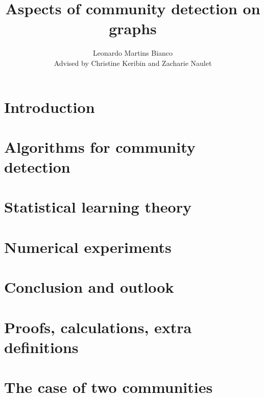 \documentclass[11pt]{report}
\title{Aspects of community detection on graphs}
\author{Leonardo Martins Bianco\\[0.5cm]{\small Advised by Christine 
Keribin and Zacharie Naulet}}
\date{ }  %
\begin{document}
\maketitle
\setcounter{tocdepth}{1}
\tableofcontents

\chapter{Introduction}


\chapter{Algorithms for community detection}



\chapter{Statistical learning theory}





\chapter{Numerical experiments}


\chapter{Conclusion and outlook}


\appendix

\chapter{Proofs, calculations, extra 
definitions}







\chapter{The case of two communities}


\clearpage  %
\nocite{*}  %


\end{document}
